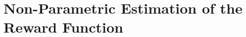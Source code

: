 \documentclass{article}
\newcommand{\overbar}[1]{\mkern 1.5mu\overline{\mkern-1.5mu#1\mkern-1.5mu}\mkern 1.5mu}
\begin{document}


\section{Non-Parametric Estimation of the Reward Function}
\end{document}

